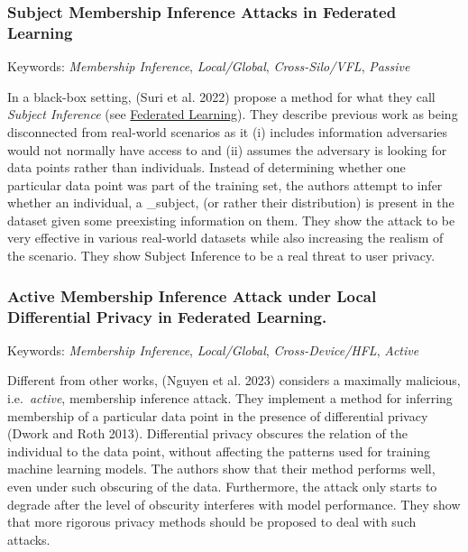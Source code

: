 \hypertarget{subject-membership-inference-attacks-in-federated-learning}{%
\subsubsection{Subject Membership Inference Attacks in Federated
Learning}\label{subject-membership-inference-attacks-in-federated-learning}}

Keywords: \emph{Membership Inference}, \emph{Local/Global},
\emph{Cross-Silo/VFL}, \emph{Passive}

In a black-box setting, (Suri et al. 2022) propose a method for what
they call \emph{Subject Inference} (see
\protect\hyperlink{federated-learning}{Federated Learning}). They
describe previous work as being disconnected from real-world scenarios
as it (i) includes information adversaries would not normally have
access to and (ii) assumes the adversary is looking for data points
rather than individuals. Instead of determining whether one particular
data point was part of the training set, the authors attempt to infer
whether an individual, a \_subject, (or rather their distribution) is
present in the dataset given some preexisting information on them. They
show the attack to be very effective in various real-world datasets
while also increasing the realism of the scenario. They show Subject
Inference to be a real threat to user privacy.

\hypertarget{active-membership-inference-attack-under-local-differential-privacy-in-federated-learning.}{%
\subsubsection{Active Membership Inference Attack under Local
Differential Privacy in Federated
Learning.}\label{active-membership-inference-attack-under-local-differential-privacy-in-federated-learning.}}

Keywords: \emph{Membership Inference}, \emph{Local/Global},
\emph{Cross-Device/HFL}, \emph{Active}

Different from other works, (Nguyen et al. 2023) considers a maximally
malicious, i.e.~\emph{active}, membership inference attack. They
implement a method for inferring membership of a particular data point
in the presence of differential privacy (Dwork and Roth 2013).
Differential privacy obscures the relation of the individual to the data
point, without affecting the patterns used for training machine learning
models. The authors show that their method performs well, even under
such obscuring of the data. Furthermore, the attack only starts to
degrade after the level of obscurity interferes with model performance.
They show that more rigorous privacy methods should be proposed to deal
with such attacks.

